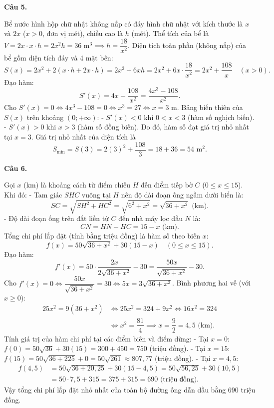 \documentclass[12pt,a4paper]{article}
\newcommand{\loigiai}[1]{\par\medskip\Needspace{4\baselineskip}\noindent\textbf{#1}\par\nobreak}
\begin{document}
\loigiai{Câu 5.}
Bể nước hình hộp chữ nhật không nắp có đáy hình chữ nhật với kích thước là $x$ và $2x$ ($x>0$, đơn vị mét), chiều cao là $h$ (mét).
Thể tích của bể là $V = 2x\cdot x\cdot h = 2x^2 h = 36\text{ m}^3 \implies h = \dfrac{18}{x^2}$.
Diện tích toàn phần (không nắp) của bể gồm diện tích đáy và 4 mặt bên:
$$S(x) = 2x^2 + 2(x\cdot h + 2x\cdot h) = 2x^2 + 6xh = 2x^2 + 6x\cdot\dfrac{18}{x^2} = 2x^2 + \dfrac{108}{x}\quad (x>0).$$
Đạo hàm:
$$S'(x) = 4x - \dfrac{108}{x^2} = \dfrac{4x^3-108}{x^2}.$$
Cho $S'(x)=0 \iff 4x^3-108=0 \iff x^3=27 \iff x=3\text{ m}$.
Bảng biến thiên của $S(x)$ trên khoảng $(0;+\infty)$:
- $S'(x)<0$ khi $0<x<3$ (hàm số nghịch biến).
- $S'(x)>0$ khi $x>3$ (hàm số đồng biến).
Do đó, hàm số đạt giá trị nhỏ nhất tại $x=3$.
Giá trị nhỏ nhất của diện tích là
$$S_{\min} = S(3) = 2(3)^2 + \dfrac{108}{3} = 18 + 36 = 54\text{ m}^2.$$

\loigiai{Câu 6.}
Gọi $x$ (km) là khoảng cách từ điểm chiếu $H$ đến điểm tiếp bờ $C$ ($0\le x\le 15$).
Khi đó:
- Tam giác $SHC$ vuông tại $H$ nên độ dài đoạn ống ngầm dưới biển là:
$$SC = \sqrt{SH^2+HC^2} = \sqrt{6^2+x^2} = \sqrt{36+x^2}\text{ (km)}.$$
- Độ dài đoạn ống trên đất liền từ $C$ đến nhà máy lọc dầu $N$ là:
$$CN = HN - HC = 15 - x\text{ (km)}.$$
Tổng chi phí lắp đặt (tính bằng triệu đồng) là hàm số theo biến $x$:
$$f(x) = 50\sqrt{36+x^2} + 30(15-x)\quad (0\le x\le 15).$$
Đạo hàm:
$$f'(x) = 50\cdot\dfrac{2x}{2\sqrt{36+x^2}} - 30 = \dfrac{50x}{\sqrt{36+x^2}} - 30.$$
Cho $f'(x)=0 \iff \dfrac{50x}{\sqrt{36+x^2}} = 30 \iff 5x = 3\sqrt{36+x^2}$.
Bình phương hai vế (với $x\ge 0$):
$$\begin{aligned}
25x^2 = 9(36+x^2) &\iff 25x^2 = 324 + 9x^2 \iff 16x^2 = 324\\
&\iff x^2 = \dfrac{81}{4} \implies x = \dfrac{9}{2} = 4{,}5\text{ (km)}.
\end{aligned}$$
Tính giá trị của hàm chi phí tại các điểm biên và điểm dừng:
- Tại $x=0$: $f(0) = 50\sqrt{36} + 30(15) = 300 + 450 = 750$ (triệu đồng).
- Tại $x=15$: $f(15) = 50\sqrt{36+225} + 0 = 50\sqrt{261} \approx 807{,}77$ (triệu đồng).
- Tại $x=4{,}5$:
$$\begin{aligned}
f(4{,}5) &= 50\sqrt{36+20{,}25} + 30(15-4{,}5) = 50\sqrt{56{,}25} + 30(10{,}5)\\
&= 50\cdot 7{,}5 + 315 = 375 + 315 = 690\text{ (triệu đồng)}.
\end{aligned}$$
Vậy tổng chi phí lắp đặt nhỏ nhất của toàn bộ đường ống dẫn dầu bằng $690$ triệu đồng.
\end{document}
